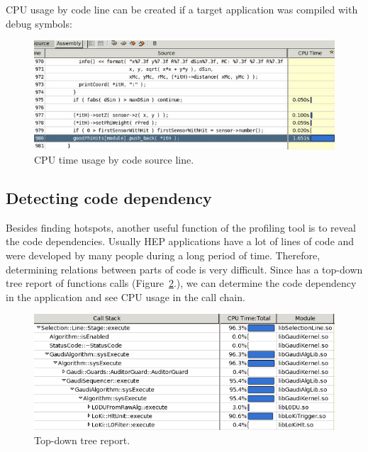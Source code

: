 \documentclass[a4paper]{jpconf}
\begin{document}
CPU usage by code line can be created if a target application was compiled with debug symbols:

\begin{figure}[H]
\begin{minipage}{\textwidth}
\includegraphics[width=\textwidth]{figs/fig05.png}
\caption{\label{fig05}CPU time usage by code source line.}
\end{minipage}
\end{figure}

\subsection{Detecting code dependency}

Besides finding hotspots, another useful function of the profiling tool is to reveal the code dependencies. 
Usually HEP applications have a lot of lines of code and were developed by many people during a long period of time. 
Therefore, determining relations between parts of code is very difficult. Since \amp  has a top-down tree report of 
functions calls (Figure~\ref{fig06}.), we can determine the code dependency in the application and see CPU usage in the
call chain.

\begin{figure}[H]
\begin{minipage}{\textwidth}
\includegraphics[width=\textwidth]{figs/fig06.png}
\caption{\label{fig06}Top-down tree report.}
\end{minipage}
\end{figure}
\end{document}
